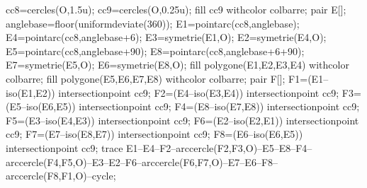 {\begin{Geometrie}[Cadre="aucun"]
      cc8=cercles(O,1.5u);
      cc9=cercles(O,0.25u);
      fill cc9 withcolor colbarre;
      pair E[];
      anglebase=floor(uniformdeviate(360));
      E1=pointarc(cc8,anglebase);
      E4=pointarc(cc8,anglebase+6);
      E3=symetrie(E1,O);
      E2=symetrie(E4,O);
      E5=pointarc(cc8,anglebase+90);
      E8=pointarc(cc8,anglebase+6+90);
      E7=symetrie(E5,O);
      E6=symetrie(E8,O);
      fill polygone(E1,E2,E3,E4) withcolor colbarre;
      fill polygone(E5,E6,E7,E8) withcolor colbarre;
      pair F[];
      F1=(E1--iso(E1,E2)) intersectionpoint cc9;
      F2=(E4--iso(E3,E4)) intersectionpoint cc9;
      F3=(E5--iso(E6,E5)) intersectionpoint cc9;
      F4=(E8--iso(E7,E8)) intersectionpoint cc9;
      F5=(E3--iso(E4,E3)) intersectionpoint cc9;
      F6=(E2--iso(E2,E1)) intersectionpoint cc9;
      F7=(E7--iso(E8,E7)) intersectionpoint cc9;
      F8=(E6--iso(E6,E5)) intersectionpoint cc9;
      trace E1--E4--F2--arccercle(F2,F3,O)--E5--E8--F4--arccercle(F4,F5,O)--E3--E2--F6--arccercle(F6,F7,O)--E7--E6--F8--arccercle(F8,F1,O)--cycle;
    \end{Geometrie}
  \fi    
}%

